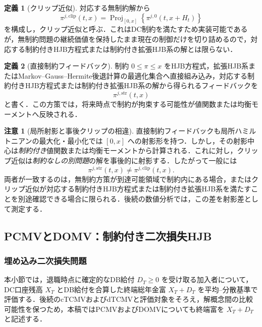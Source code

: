 \documentclass[10pt,a4paper]{article}
\theoremstyle{plain}
\theoremstyle{definition}
\newtheorem{definition}{定義}
\newtheorem{remark}{注意}
\DeclareMathOperator{\Proj}{Proj}
\begin{document}
\begin{definition}[クリップ近似]
対応する無制約解から
\begin{equation}
  \pi^{j,\mathrm{clip}}(t,x)
  =\Proj_{[0,x]}\!\left\{\pi^{j,0}(t,x+H_t)\right\}
  \label{eq:クリップ-def}
\end{equation}
を構成し，クリップ近似と呼ぶ．これはDC制約を満たすため実装可能であるが，無制約問題の継続価値を保持したまま現在の制御だけを切り詰めるので，対応する制約付きHJB方程式または制約付き拡張HJB系の解とは限らない．
\end{definition}

\begin{definition}[直接制約フィードバック]
制約 $0\leq\pi\leq x$ をHJB方程式，拡張HJB系またはMarkov--Gauss--Hermite後退計算の最適化集合へ直接組み込み，対応する制約付きHJB方程式または制約付き拡張HJB系の解から得られるフィードバックを
\[
  \pi^{j,\mathrm{str}}(t,x)
\]
と書く．この方策では，将来時点で制約が拘束する可能性が値関数または均衡モーメントへ反映される．
\end{definition}

\begin{remark}[局所射影と事後クリップの相違]
直接制約フィードバックも局所ハミルトニアンの最大化・最小化では $[0,x]$ への射影形を持つ．しかし，その射影中心は\emph{制約付き}値関数または均衡モーメントから計算される．これに対し，クリップ近似は\emph{制約なしの別問題}の解を事後的に射影する．したがって一般には
\[
  \pi^{j,\mathrm{str}}(t,x)\neq\pi^{j,\mathrm{clip}}(t,x).
\]
両者が一致するのは，無制約方策が到達可能領域で制約内にある場合，またはクリップ近似が対応する制約付きHJB方程式または制約付き拡張HJB系を満たすことを別途確認できる場合に限られる．後続の数値分析では，この差を射影差として測定する．
\end{remark}

\subsection{PCMVとDOMV：制約付き二次損失HJB}
\label{sec:pcmv-domv}

\subsubsection{埋め込み二次損失問題}

本小節では，退職時点に確定的なDB給付 $D_T\geq0$ を受け取る加入者について，DC口座残高 $X_T$ とDB給付を合算した終端総年金富 $X_T+D_T$ を平均--分散基準で評価する．後続のcTCMVおよびdTCMVと評価対象をそろえ，解概念間の比較可能性を保つため，本稿ではPCMVおよびDOMVについても終端富を $X_T+D_T$ と記述する．
\end{document}
